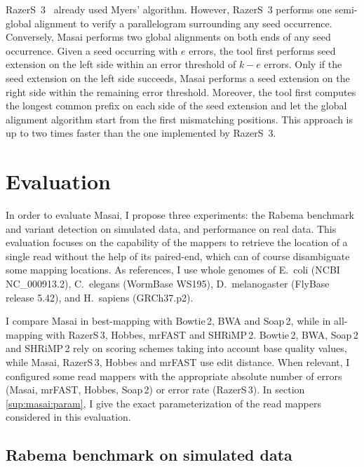 RazerS~3~\citep{Weese2012} already used Myers' algorithm.
However, RazerS~3 performs one semi-global alignment to verify a parallelogram surrounding any seed occurrence.
Conversely, Masai performs two global alignments on both ends of any seed occurrence.
Given a seed occurring with $e$ errors, the tool first performs seed extension on the left side within an error threshold of $k - e$ errors.
Only if the seed extension on the left side succeeds, Masai performs a seed extension on the right side within the remaining error threshold.
Moreover, the tool first computes the longest common prefix on each side of the seed extension and let the global alignment algorithm start from the first mismatching positions.
This approach is up to two times faster than the one implemented by RazerS~3.


\section{Evaluation}
\label{masai:evaluation}

In order to evaluate Masai, I propose three experiments: the Rabema benchmark and variant detection on simulated data, and performance on real data.
This evaluation focuses on the capability of the mappers to retrieve the location of a single read without the help of its paired-end, which can of course disambiguate some mapping locations.
As references, I use whole genomes of E.~coli (NCBI NC\_000913.2), C.~elegans (WormBase WS195), D.~melanogaster (FlyBase release 5.42), and H.~sapiens (GRCh37.p2).

I compare Masai in best-mapping with Bowtie\,2, BWA and Soap\,2, while in all-mapping with RazerS\,3, Hobbes, mrFAST and SHRiMP\,2.
Bowtie\,2, BWA, Soap\,2 and SHRiMP\,2 rely on scoring schemes taking into account base quality values, while Masai, RazerS\,3, Hobbes and mrFAST use edit distance.
When relevant, I configured some read mappers with the appropriate absolute number of errors (Masai, mrFAST, Hobbes, Soap\,2) or error rate (RazerS\,3).
In section \ref{sup:masai:param}, I give the exact parameterization of the read mappers considered in this evaluation.

\subsection{Rabema benchmark on simulated data}
\label{masai:evaluation:rabema}

